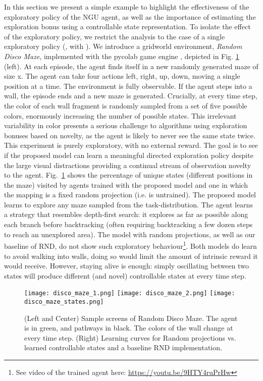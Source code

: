 \documentclass{article} \usepackage{iclr2020_conference,times}
\begin{document}
In this section we present a simple example to highlight the effectiveness of the exploratory policy of the NGU agent, as well as the importance of estimating the exploration bonus using a controllable state representation.
To isolate the effect of the exploratory policy, we restrict the analysis to the case of a single exploratory policy (, with ).
We introduce a gridworld environment, \emph{Random Disco Maze}, implemented with the pycolab game engine \citep{pycolab}, depicted in Fig. \ref{fig_disco_maze} (left). At each episode, the agent finds itself in a new randomly generated maze of size x. 
The agent can take four actions left, right, up, down, moving a single position at a time. The environment is fully observable. If the agent steps into a wall, the episode ends and a new maze is generated. Crucially, at every time step, the color of each wall fragment is randomly sampled from a set of five possible colors, enormously increasing the number of possible states. 
This irrelevant variability in color presents a serious challenge to algorithms using exploration bonuses based on novelty, as the agent is likely to never see the same state twice.
This experiment is purely exploratory, with no external reward. The goal is to see if the proposed model can learn a meaningful directed exploration policy despite the large visual distractions providing a continual stream of observation novelty to the agent. 
Fig.~\ref{fig_disco_maze} shows the percentage of unique states (different positions in the maze) visited by agents trained with the proposed model and one in which the mapping  is a fixed random projection (i.e.  is untrained).
The proposed model learns to explore any maze sampled from the task-distribution. The agent learns a strategy that resembles depth-first search: it  explores as far as possible along each branch before backtracking (often requiring backtracking a few dozen steps to reach an unexplored area).
The model with random projections, as well as our baseline of RND, do not show such exploratory behaviour\footnote{See video of the trained agent here: \url{https://youtu.be/9HTY4ruPrHw}}. Both models do learn to avoid walking into walls, doing so would limit the amount of intrinsic reward it would receive. However, staying alive is enough: simply oscillating between two states will produce different (and novel) controllable states at every time step.
\begin{figure}[!tbp]
  \centering
  \texttt{[image: disco\_maze\_1.png]}
  \hspace{1ex}
  \texttt{[image: disco\_maze\_2.png]}
  \hspace{2ex}
    \texttt{[image: disco\_maze\_states.png]}
\vspace{-1ex}
    \caption{(Left and Center) Sample screens of Random Disco Maze. The agent is in green, and pathways in black. The colors of the wall change at every time step. (Right) Learning curves for Random projections vs. learned controllable states and a baseline RND implementation.}
    \label{fig_disco_maze}
\vspace{-3ex}
\end{figure}
\end{document}

